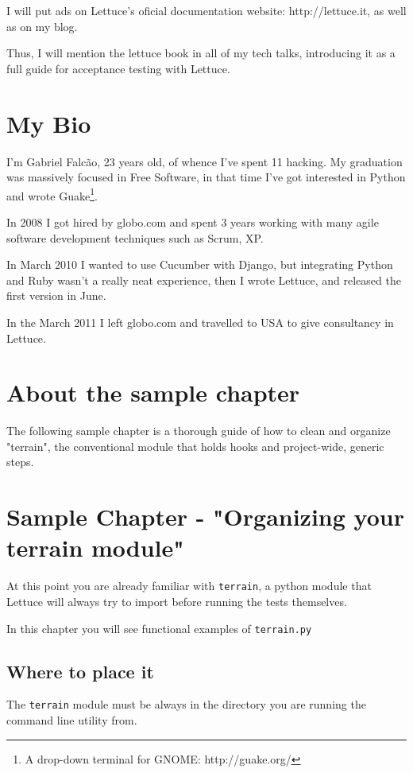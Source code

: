 \documentclass[letterpaper]{article}
\begin{document}
I will put ads on Lettuce's oficial documentation website:
http://lettuce.it, as well as on my blog.

Thus, I will mention the lettuce book in all of my tech talks,
introducing it as a full guide for acceptance testing with Lettuce.

\section*{My Bio}

I'm Gabriel Falcão, 23 years old, of whence I've spent 11 hacking. My
graduation was massively focused in Free Software, in that time I've
got interested in Python and wrote Guake\footnote{A drop-down terminal for GNOME: http://guake.org/}.

In 2008 I got hired by globo.com and spent 3 years working with
many agile software development techniques such as Scrum, XP.

In March 2010 I wanted to use Cucumber with Django, but integrating
Python and Ruby wasn't a really neat experience, then I wrote Lettuce,
and released the first version in June.

In the March 2011 I left globo.com and travelled to USA to give
consultancy in Lettuce.

\section*{About the sample chapter}

The following sample chapter is a thorough guide of how to clean and
organize "terrain", the conventional module that holds hooks and
project-wide, generic steps.

\section*{Sample Chapter - "Organizing your terrain module"}

At this point you are already familiar with \texttt{terrain}, a python
module that Lettuce will always try to import before running the tests
themselves.

In this chapter you will see functional examples of \texttt{terrain.py}

\subsection*{Where to place it}

The \texttt{terrain} module must be always in the directory you are
running the command line utility from.
\end{document}
